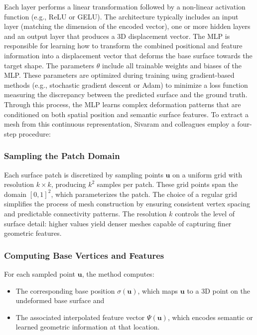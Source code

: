 Each layer performs a linear transformation followed by a non-linear activation function (e.g., ReLU or GELU). 
The architecture typically includes an input layer (matching the dimension of the encoded vector), one or more hidden layers and an output layer that produces a 3D displacement vector. 
The MLP is responsible for learning how to transform the combined positional and feature information into a displacement vector that deforms the base surface towards the target shape. 
The parameters $\theta$ include all trainable weights and biases of the MLP. 
These parameters are optimized during training using gradient-based methods (e.g., stochastic gradient descent or Adam) to minimize a loss function measuring the discrepancy between the predicted surface and the ground truth. 
Through this process, the MLP learns complex deformation patterns that are conditioned on both spatial position and semantic surface features. 
To extract a mesh from this continuous representation, Sivaram and colleagues employ a four-step procedure: 

\subsubsection{Sampling the Patch Domain}

Each surface patch is discretized by sampling points $\mathbf{u}$ on a uniform grid with resolution $k \times k$, producing $k^2$ samples per patch. 
These grid points span the domain $[0,1]^2$, which parameterizes the patch. 
The choice of a regular grid simplifies the process of mesh construction by ensuring consistent vertex spacing and predictable connectivity patterns. 
The resolution $k$ controls the level of surface detail: higher values yield denser meshes capable of capturing finer geometric features. 

\subsubsection{Computing Base Vertices and Features}

For each sampled point $\mathbf{u}$, the method computes: 
\begin{itemize}
  \item The corresponding base position $\sigma(\mathbf{u})$, which maps $\mathbf{u}$ to a 3D point on the undeformed base surface and 
  \item The associated interpolated feature vector $\Psi(\mathbf{u})$, which encodes semantic or learned geometric information at that location.
\end{itemize}

